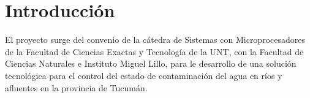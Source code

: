 


\chapter{Introducción}
\label{chap:introduccion}

El proyecto surge del convenio de la cátedra de Sistemas con Microprocesadores de la Facultad de Ciencias Exactas y Tecnología de la UNT, con la Facultad de Ciencias Naturales e Instituto Miguel Lillo, para le desarrollo de una solución tecnológica para el control del estado de contaminación del agua en ríos y afluentes en la provincia de Tucumán.

